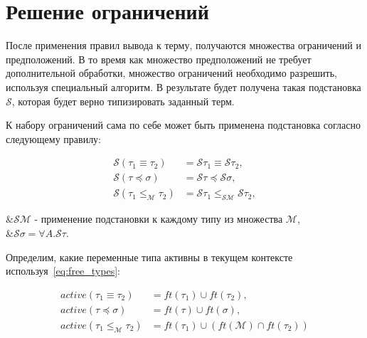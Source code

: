 \section{Решение ограничений}
\label{sec:constraint_solving}

После применения правил вывода к терму, получаются множества ограничений и предположений.
В то время как множество предположений не требует дополнительной обработки, множество ограничений необходимо разрешить, используя специальный алгоритм.
В результате будет получена такая подстановка $\mathcal{S}$, которая будет верно типизировать заданный терм.

К набору ограничений сама по себе может быть применена подстановка согласно следующему правилу:

\begin{equation}
    \label{eq:consts_subst}
    \begin{aligned}
        \mathcal{S} (\tau_1 \equiv \tau_2)             &= \mathcal{S} \tau_1 \equiv \mathcal{S} \tau_2, \\
        \mathcal{S} (\tau \preceq \sigma)              &= \mathcal{S} \tau \preceq \mathcal{S} \sigma,  \\
        \mathcal{S} (\tau_1 \leq_{\mathcal{M}} \tau_2) &= \mathcal{S} \tau_1 \leq_{\mathcal{S} \mathcal{M}} \mathcal{S} \tau_2,
    \end{aligned}
\end{equation}
\begin{eqrem}
    &$\mathcal{S} \mathcal{M}$ - применение подстановки к каждому типу из множества $\mathcal{M}$,\\
    &$\mathcal{S} \sigma = \forall A. \mathcal{S} \tau$.\\
\end{eqrem}

Определим, какие переменные типа активны в текущем контексте используя~\ref{eq:free_types}:

\begin{equation}
    \label{eq:active_vars}
    \begin{aligned}
        active(\tau_1 \equiv \tau_2) &= ft(\tau_1) \cup ft(\tau_2), \\
        active(\tau \preceq \sigma) &= ft(\tau) \cup ft(\sigma), \\
        active(\tau_1 \leq_{\mathcal{M}} \tau_2) &= ft(\tau_1) \cup (ft(\mathcal{M}) \cap ft(\tau_2))
    \end{aligned}
\end{equation}

